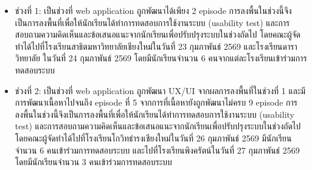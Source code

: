 \begin{itemize}
    \item ช่วงที่ 1: เป็นช่วงที่ web application ถูกพัฒนาได้เพียง 2 episode การลงพื้นในช่วงนี้จึงเป็นการลงพื้นที่เพื่อให้นักเรียนได้ทำการทดสอบการใช้งานระบบ (usability test) และการสอบถามความคิดเห็นและข้อเสนอแนะจากนักเรียนเพื่อปรับปรุงระบบในช่วงถัดไป 
    โดยคณะผู้จัดทำได้ไปที่โรงเรียนสาธิตมหาวิทยาลัยเชียงใหม่ในวันที่ 23 กุมภาพันธ์ 2569 และโรงเรียนดาราวิทยาลัย ในวันที่ 24 กุมภาพันธ์ 2569 
    โดยมีนักเรียนจำนวน 6 คนจากแต่ละโรงเรียนเข้าร่วมการทดสอบระบบ

    \item ช่วงที่ 2: เป็นช่วงที่ web application ถูกพัฒนา UX/UI จากผลการลงพื้นที่ในช่วงที่ 1 และมีการพัฒนาเนื้อหาไปจนถึง episode ที่ 5 จากการที่เนื้อหายังถูกพัฒนาไม่ครบ 9 
    episode การลงพื้นในช่วงนี้จึงเป็นการลงพื้นที่เพื่อให้นักเรียนได้ทำการทดสอบการใช้งานระบบ (usability test) 
    และการสอบถามความคิดเห็นและข้อเสนอแนะจากนักเรียนเพื่อปรับปรุงระบบในช่วงถัดไป 
    โดยคณะผู้จัดทำได้ไปที่โรงเรียนโกวิทธำรงเชียงใหม่ในวันที่ 26 กุมภาพันธ์ 2569 มีนักเรียนจำนวน 6 คนเข้าร่วมการทดสอบระบบ และไปที่โรงเรียนพิงครัตน์ในวันที่ 27 กุมภาพันธ์ 2569 โดยมีนักเรียนจำนวน 3 คนเข้าร่วมการทดสอบระบบ
    

\end{itemize}

